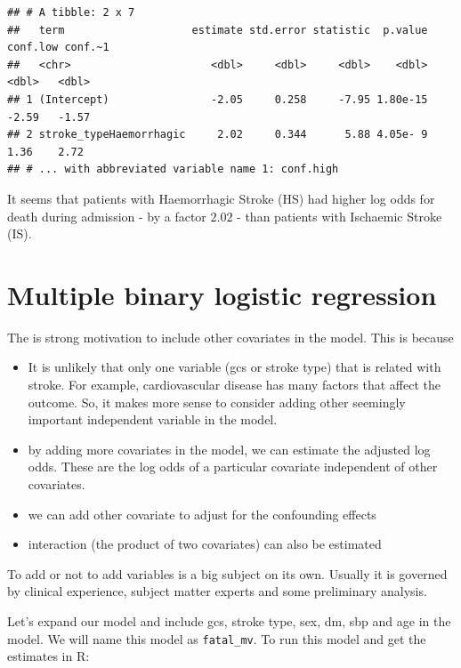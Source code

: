 \documentclass[
  10pt,
]{krantz}
\providecommand{\tightlist}{%
  \setlength{\itemsep}{0pt}\setlength{\parskip}{0pt}}
\begin{document}
\begin{verbatim}
## # A tibble: 2 x 7
##   term                    estimate std.error statistic  p.value conf.low conf.~1
##   <chr>                      <dbl>     <dbl>     <dbl>    <dbl>    <dbl>   <dbl>
## 1 (Intercept)                -2.05     0.258     -7.95 1.80e-15    -2.59   -1.57
## 2 stroke_typeHaemorrhagic     2.02     0.344      5.88 4.05e- 9     1.36    2.72
## # ... with abbreviated variable name 1: conf.high
\end{verbatim}

It seems that patients with Haemorrhagic Stroke (HS) had higher log odds for death during admission - by a factor \(2.02\) - than patients with Ischaemic Stroke (IS).

\hypertarget{multiple-binary-logistic-regression}{%
\section{\texorpdfstring{Multiple binary logistic regression}{Multiple binary logistic regression}}\label{multiple-binary-logistic-regression}}

The is strong motivation to include other covariates in the model. This is because

\begin{itemize}
\tightlist
\item
  It is unlikely that only one variable (gcs or stroke type) that is related with stroke. For example, cardiovascular disease has many factors that affect the outcome. So, it makes more sense to consider adding other seemingly important independent variable in the model.
\item
  by adding more covariates in the model, we can estimate the adjusted log odds. These are the log odds of a particular covariate independent of other covariates.
\item
  we can add other covariate to adjust for the confounding effects
\item
  interaction (the product of two covariates) can also be estimated
\end{itemize}

To add or not to add variables is a big subject on its own. Usually it is governed by clinical experience, subject matter experts and some preliminary analysis.

Let's expand our model and include gcs, stroke type, sex, dm, sbp and age in the model. We will name this model as \texttt{fatal\_mv}. To run this model and get the estimates in R:
\end{document}
